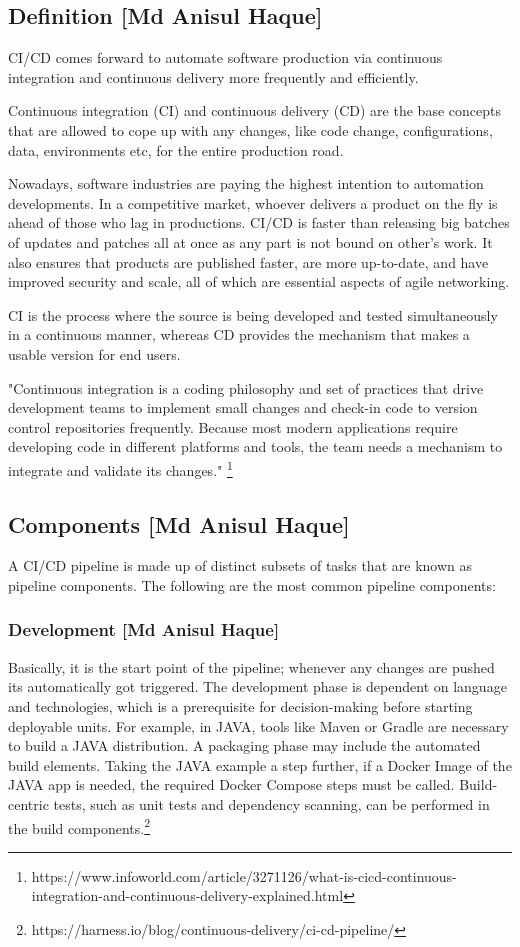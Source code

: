 \subsection{Definition [Md Anisul Haque]}
%
CI/CD comes forward to automate software production via continuous integration and continuous delivery more frequently and efficiently.

Continuous integration (CI) and continuous delivery (CD) are the base concepts that are allowed to cope up with any changes, like code change, configurations, data, environments etc, for the entire production road\cite{CD}.

Nowadays, software industries are paying the highest intention to automation developments. In a competitive market, whoever delivers a product on the fly is ahead of those who lag in productions. CI/CD is faster than releasing big batches of updates and patches all at once as any part is not bound on other's work. It also ensures that products are published faster, are more up-to-date, and have improved security and scale, all of which are essential aspects of agile networking.

CI is the process where the source is being developed and tested simultaneously in a continuous manner, whereas CD provides the mechanism that makes a usable version for end users\cite{CDHandsOn}.

"Continuous integration is a coding philosophy and set of practices that drive development teams to implement small changes and check-in code to version control repositories frequently. Because most modern applications require developing code in different platforms and tools, the team needs a mechanism to integrate and validate its changes." \footnote{https://www.infoworld.com/article/3271126/what-is-cicd-continuous-integration-and-continuous-delivery-explained.html}

%
\subsection{Components [Md Anisul Haque]}
%
A CI/CD pipeline is made up of distinct subsets of tasks that are known as pipeline components. The following are the most common pipeline components:

\subsubsection{Development [Md Anisul Haque]}

Basically, it is the start point of the pipeline; whenever any changes are pushed its automatically got triggered. The development phase is dependent on language and technologies, which is a prerequisite for decision-making before starting deployable units. For example, in JAVA, tools like Maven or Gradle are necessary to build a JAVA distribution. A packaging phase may include the automated build elements. Taking the JAVA example a step further, if a Docker Image of the JAVA app is needed, the required Docker Compose steps must be called. Build-centric tests, such as unit tests and dependency scanning, can be performed in the build components.\footnote{https://harness.io/blog/continuous-delivery/ci-cd-pipeline/}


